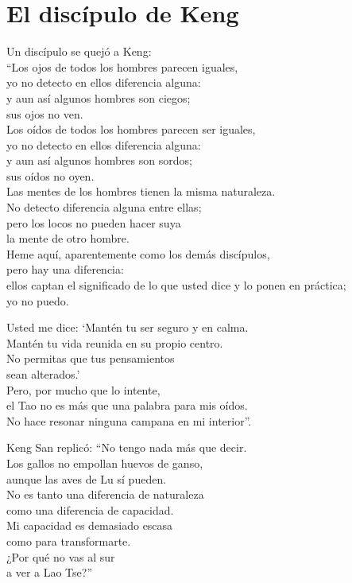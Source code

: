 \documentclass[book,b5paper,hidelinks,final]{memoir}
\begin{document}
	\chapter*{El discípulo de Keng}
	
	Un discípulo se quejó a Keng:\\
	``Los ojos de todos los hombres parecen iguales,\\
	yo no detecto en ellos diferencia alguna:\\
	y aun así algunos hombres son ciegos;\\
	sus ojos no ven.\\
	Los oídos de todos los hombres parecen ser iguales,\\
	yo no detecto en ellos diferencia alguna:\\
	y aun así algunos hombres son sordos;\\
	sus oídos no oyen.\\
	Las mentes de los hombres tienen la misma naturaleza.\\
	No detecto diferencia alguna entre ellas;\\
	pero los locos no pueden hacer suya\\
	la mente de otro hombre.\\
	Heme aquí, aparentemente como los demás discípulos,\\
	pero hay una diferencia:\\
	ellos captan el significado de lo que usted dice y lo ponen en
	práctica;\\
	yo no puedo.
	
	Usted me dice: `Mantén tu ser seguro y en calma.\\
	Mantén tu vida reunida en su propio centro.\\
	No permitas que tus pensamientos\\
	sean alterados.'\\
	Pero, por mucho que lo intente,\\
	el Tao no es más que una palabra para mis oídos.\\
	No hace resonar ninguna campana en mi interior''.
	
	Keng San replicó: ``No tengo nada más que decir.\\
	Los gallos no empollan huevos de ganso,\\
	aunque las aves de Lu sí pueden.\\
	No es tanto una diferencia de naturaleza\\
	como una diferencia de capacidad.\\
	Mi capacidad es demasiado escasa\\
	como para transformarte.\\
	¿Por qué no vas al sur\\
	a ver a Lao Tse?''
	
\end{document}
